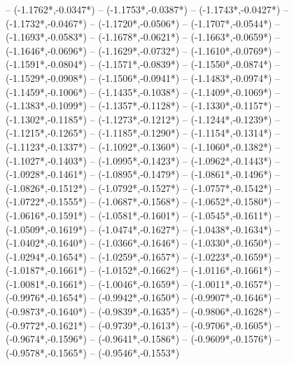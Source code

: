 {	-- ({-1.1762*\dx},{-0.0347*\dy})
	-- ({-1.1753*\dx},{-0.0387*\dy})
	-- ({-1.1743*\dx},{-0.0427*\dy})
	-- ({-1.1732*\dx},{-0.0467*\dy})
	-- ({-1.1720*\dx},{-0.0506*\dy})
	-- ({-1.1707*\dx},{-0.0544*\dy})
	-- ({-1.1693*\dx},{-0.0583*\dy})
	-- ({-1.1678*\dx},{-0.0621*\dy})
	-- ({-1.1663*\dx},{-0.0659*\dy})
	-- ({-1.1646*\dx},{-0.0696*\dy})
	-- ({-1.1629*\dx},{-0.0732*\dy})
	-- ({-1.1610*\dx},{-0.0769*\dy})
	-- ({-1.1591*\dx},{-0.0804*\dy})
	-- ({-1.1571*\dx},{-0.0839*\dy})
	-- ({-1.1550*\dx},{-0.0874*\dy})
	-- ({-1.1529*\dx},{-0.0908*\dy})
	-- ({-1.1506*\dx},{-0.0941*\dy})
	-- ({-1.1483*\dx},{-0.0974*\dy})
	-- ({-1.1459*\dx},{-0.1006*\dy})
	-- ({-1.1435*\dx},{-0.1038*\dy})
	-- ({-1.1409*\dx},{-0.1069*\dy})
	-- ({-1.1383*\dx},{-0.1099*\dy})
	-- ({-1.1357*\dx},{-0.1128*\dy})
	-- ({-1.1330*\dx},{-0.1157*\dy})
	-- ({-1.1302*\dx},{-0.1185*\dy})
	-- ({-1.1273*\dx},{-0.1212*\dy})
	-- ({-1.1244*\dx},{-0.1239*\dy})
	-- ({-1.1215*\dx},{-0.1265*\dy})
	-- ({-1.1185*\dx},{-0.1290*\dy})
	-- ({-1.1154*\dx},{-0.1314*\dy})
	-- ({-1.1123*\dx},{-0.1337*\dy})
	-- ({-1.1092*\dx},{-0.1360*\dy})
	-- ({-1.1060*\dx},{-0.1382*\dy})
	-- ({-1.1027*\dx},{-0.1403*\dy})
	-- ({-1.0995*\dx},{-0.1423*\dy})
	-- ({-1.0962*\dx},{-0.1443*\dy})
	-- ({-1.0928*\dx},{-0.1461*\dy})
	-- ({-1.0895*\dx},{-0.1479*\dy})
	-- ({-1.0861*\dx},{-0.1496*\dy})
	-- ({-1.0826*\dx},{-0.1512*\dy})
	-- ({-1.0792*\dx},{-0.1527*\dy})
	-- ({-1.0757*\dx},{-0.1542*\dy})
	-- ({-1.0722*\dx},{-0.1555*\dy})
	-- ({-1.0687*\dx},{-0.1568*\dy})
	-- ({-1.0652*\dx},{-0.1580*\dy})
	-- ({-1.0616*\dx},{-0.1591*\dy})
	-- ({-1.0581*\dx},{-0.1601*\dy})
	-- ({-1.0545*\dx},{-0.1611*\dy})
	-- ({-1.0509*\dx},{-0.1619*\dy})
	-- ({-1.0474*\dx},{-0.1627*\dy})
	-- ({-1.0438*\dx},{-0.1634*\dy})
	-- ({-1.0402*\dx},{-0.1640*\dy})
	-- ({-1.0366*\dx},{-0.1646*\dy})
	-- ({-1.0330*\dx},{-0.1650*\dy})
	-- ({-1.0294*\dx},{-0.1654*\dy})
	-- ({-1.0259*\dx},{-0.1657*\dy})
	-- ({-1.0223*\dx},{-0.1659*\dy})
	-- ({-1.0187*\dx},{-0.1661*\dy})
	-- ({-1.0152*\dx},{-0.1662*\dy})
	-- ({-1.0116*\dx},{-0.1661*\dy})
	-- ({-1.0081*\dx},{-0.1661*\dy})
	-- ({-1.0046*\dx},{-0.1659*\dy})
	-- ({-1.0011*\dx},{-0.1657*\dy})
	-- ({-0.9976*\dx},{-0.1654*\dy})
	-- ({-0.9942*\dx},{-0.1650*\dy})
	-- ({-0.9907*\dx},{-0.1646*\dy})
	-- ({-0.9873*\dx},{-0.1640*\dy})
	-- ({-0.9839*\dx},{-0.1635*\dy})
	-- ({-0.9806*\dx},{-0.1628*\dy})
	-- ({-0.9772*\dx},{-0.1621*\dy})
	-- ({-0.9739*\dx},{-0.1613*\dy})
	-- ({-0.9706*\dx},{-0.1605*\dy})
	-- ({-0.9674*\dx},{-0.1596*\dy})
	-- ({-0.9641*\dx},{-0.1586*\dy})
	-- ({-0.9609*\dx},{-0.1576*\dy})
	-- ({-0.9578*\dx},{-0.1565*\dy})
	-- ({-0.9546*\dx},{-0.1553*\dy})
}
